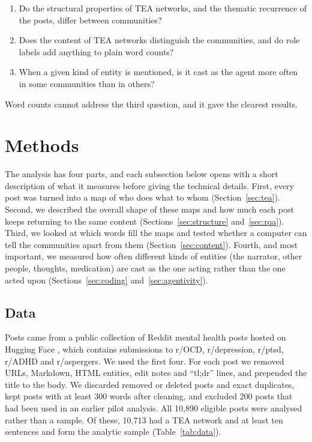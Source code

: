 \documentclass[11pt,a4paper]{article}
\begin{document}
\begin{enumerate}
\item Do the structural properties of TEA networks, and the thematic recurrence of the posts, differ between communities?
\item Does the content of TEA networks distinguish the communities, and do role labels add anything to plain word counts?
\item When a given kind of entity is mentioned, is it cast as the agent more often in some communities than in others?
\end{enumerate}

Word counts cannot address the third question, and it gave the clearest results.

\section{Methods}

The analysis has four parts, and each subsection below opens with a short description of what it measures before giving the technical details. First, every post was turned into a map of who does what to whom (Section~\ref{sec:tea}). Second, we described the overall shape of these maps and how much each post keeps returning to the same content (Sections~\ref{sec:structure} and~\ref{sec:rqa}). Third, we looked at which words fill the maps and tested whether a computer can tell the communities apart from them (Section~\ref{sec:content}). Fourth, and most important, we measured how often different kinds of entities (the narrator, other people, thoughts, medication) are cast as the one acting rather than the one acted upon (Sections~\ref{sec:coding} and~\ref{sec:agentivity}).

\subsection{Data}

Posts came from a public collection of Reddit mental health posts hosted on Hugging Face \citep{solomonk_dataset}, which contains submissions to r/OCD, r/depression, r/ptsd, r/ADHD and r/aspergers. We used the first four. For each post we removed URLs, Markdown, HTML entities, edit notes and ``tl;dr'' lines, and prepended the title to the body. We discarded removed or deleted posts and exact duplicates, kept posts with at least 300 words after cleaning, and excluded 200 posts that had been used in an earlier pilot analysis. All 10,890 eligible posts were analysed rather than a sample. Of these, 10,713 had a TEA network and at least ten sentences and form the analytic sample (Table~\ref{tab:data}).
\end{document}
